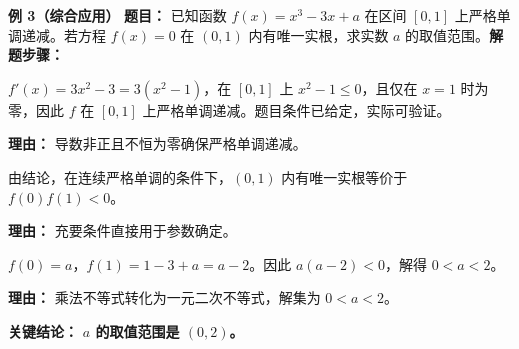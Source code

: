 \begin{examplebox}
	\medskip
	\textbf{\textcolor{CExample}{例 3（综合应用）}}
	\textbf{\textcolor{CExample}{题目：}}
	已知函数 $f(x)=x^3-3x+a$ 在区间 $[0,1]$ 上严格单调递减。若方程 $f(x)=0$ 在 $(0,1)$ 内有唯一实根，求实数 $a$ 的取值范围。\textbf{\textcolor{CExample}{解题步骤：}}
	\begin{description}[style=nextline, leftmargin=2.8em, labelsep=0.5em, itemsep=0.45em]
		\item[\textbf{第一步（验证单调条件）：}]
			$f'(x)=3x^2-3=3(x^2-1)$，在 $[0,1]$ 上 $x^2-1\le 0$，且仅在 $x=1$ 时为零，因此 $f$ 在 $[0,1]$ 上严格单调递减。题目条件已给定，实际可验证。
			\par\textbf{理由：} 导数非正且不恒为零确保严格单调递减。
		\item[\textbf{第二步（套用充要条件）：}]
			由结论，在连续严格单调的条件下，$(0,1)$ 内有唯一实根等价于 $f(0)f(1)<0$。
			\par\textbf{理由：} 充要条件直接用于参数确定。
		\item[\textbf{第三步（解不等式求范围）：}]
			$f(0)=a$，$f(1)=1-3+a=a-2$。因此 $a(a-2)<0$，解得 $0<a<2$。
			\par\textbf{理由：} 乘法不等式转化为一元二次不等式，解集为 $0<a<2$。
	\end{description}
	\textbf{\textcolor{CExample}{关键结论：}}
	\textbf{$a$ 的取值范围是 $(0,2)$。}
\end{examplebox}
